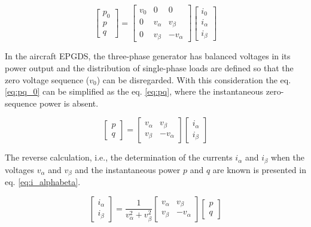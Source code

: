 \begin{equation}
\begin{bmatrix}
p_0\\
p\\
q
\end{bmatrix}=
\begin{bmatrix}
v_0		&	0			&	0\\
0		&	v_{\alpha}	&	v_{\beta}\\
0		&	v_{\beta}	&	-v_{\alpha}
\end{bmatrix}
\begin{bmatrix}
i_{0}\\
i_{\alpha}\\
i_{\beta}
\end{bmatrix}
\label{eq:pq_0}
\end{equation} 

In the aircraft EPGDS, the three-phase generator has balanced voltages in its power output and the distribution of single-phase loads are defined so that the zero voltage sequence ($v_0$) can be disregarded. With this consideration the eq. \ref{eq:pq_0} can be simplified as the eq. \ref{eq:pq}, where the instantaneous zero-sequence power is absent.

\begin{equation}
\begin{bmatrix}
p\\
q
\end{bmatrix}=
\begin{bmatrix}
v_{\alpha}	&	v_{\beta}\\
v_{\beta}	&	-v_{\alpha}
\end{bmatrix}
\begin{bmatrix}
i_{\alpha}\\
i_{\beta}
\end{bmatrix}
\label{eq:pq}
\end{equation} 

The reverse calculation, i.e., the determination of the currents $i_{\alpha}$ and $i_{\beta}$ when the voltages $v_{\alpha}$ and $v_{\beta}$ and the instantaneous power $p$ and $q$ are known is presented in eq. \ref{eq:i_alphabeta}.

\begin{equation}
\begin{bmatrix}
i_{\alpha}\\
i_{\beta}
\end{bmatrix}=
\dfrac{1}{v_{\alpha}^2+v_{\beta}^2}
\begin{bmatrix}
v_{\alpha}	&	v_{\beta}\\
v_{\beta}	&	-v_{\alpha}
\end{bmatrix}
\begin{bmatrix}
p\\
q
\end{bmatrix}
\label{eq:i_alphabeta}
\end{equation}

